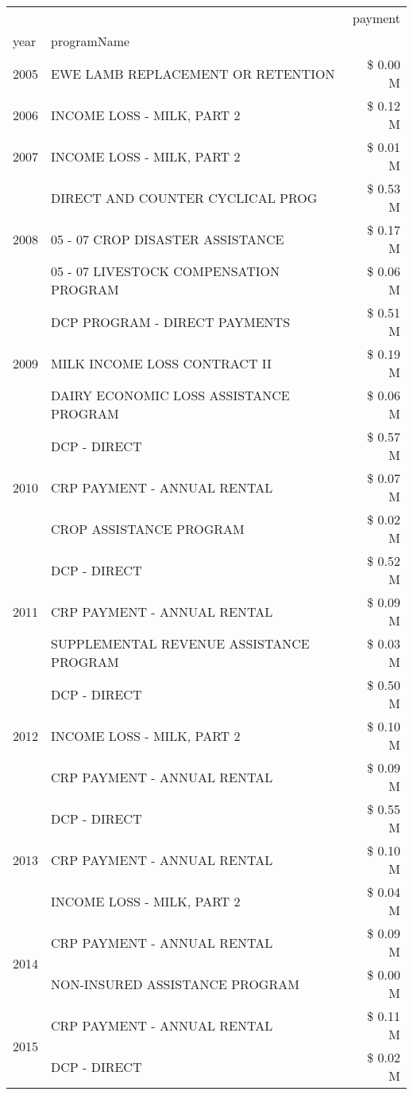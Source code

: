 \begin{tabular}{llr}
\toprule
 &  & payment \\
year & programName &  \\
\midrule
2005 & EWE LAMB REPLACEMENT OR RETENTION & \$ 0.00 M \\
\cline{1-3}
2006 & INCOME LOSS - MILK, PART 2 & \$ 0.12 M \\
\cline{1-3}
2007 & INCOME LOSS - MILK, PART 2 & \$ 0.01 M \\
\cline{1-3}
\multirow[t]{3}{*}{2008} & DIRECT AND COUNTER CYCLICAL PROG & \$ 0.53 M \\
 & 05 - 07 CROP DISASTER ASSISTANCE & \$ 0.17 M \\
 & 05 - 07 LIVESTOCK COMPENSATION PROGRAM & \$ 0.06 M \\
\cline{1-3}
\multirow[t]{3}{*}{2009} & DCP PROGRAM - DIRECT PAYMENTS & \$ 0.51 M \\
 & MILK INCOME LOSS CONTRACT II & \$ 0.19 M \\
 & DAIRY ECONOMIC LOSS ASSISTANCE PROGRAM & \$ 0.06 M \\
\cline{1-3}
\multirow[t]{3}{*}{2010} & DCP - DIRECT & \$ 0.57 M \\
 & CRP PAYMENT - ANNUAL RENTAL & \$ 0.07 M \\
 & CROP ASSISTANCE PROGRAM & \$ 0.02 M \\
\cline{1-3}
\multirow[t]{3}{*}{2011} & DCP - DIRECT & \$ 0.52 M \\
 & CRP PAYMENT - ANNUAL RENTAL & \$ 0.09 M \\
 & SUPPLEMENTAL REVENUE ASSISTANCE PROGRAM & \$ 0.03 M \\
\cline{1-3}
\multirow[t]{3}{*}{2012} & DCP - DIRECT & \$ 0.50 M \\
 & INCOME LOSS - MILK, PART 2 & \$ 0.10 M \\
 & CRP PAYMENT - ANNUAL RENTAL & \$ 0.09 M \\
\cline{1-3}
\multirow[t]{3}{*}{2013} & DCP - DIRECT & \$ 0.55 M \\
 & CRP PAYMENT - ANNUAL RENTAL & \$ 0.10 M \\
 & INCOME LOSS - MILK, PART 2 & \$ 0.04 M \\
\cline{1-3}
\multirow[t]{2}{*}{2014} & CRP PAYMENT - ANNUAL RENTAL & \$ 0.09 M \\
 & NON-INSURED ASSISTANCE PROGRAM & \$ 0.00 M \\
\cline{1-3}
\multirow[t]{3}{*}{2015} & CRP PAYMENT - ANNUAL RENTAL & \$ 0.11 M \\
 & DCP - DIRECT & \$ 0.02 M \\

\end{tabular}
